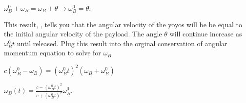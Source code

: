 \documentclass[letterpaper,10pt,english]{sphinxmanual}
\begin{document}
\(\omega_B^0 +\omega_B = \omega_B +\dot{\theta} \rightarrow \omega_B^0 =
\dot{\theta}\).

\begin{sphinxVerbatim}[commandchars=\\\{\}]
  
   
\end{sphinxVerbatim}

This result, , tells you that the angular velocity of the yoyos will be
be equal to the initial angular velocity of the payload. The angle
\(\theta\) will
continue increase as \(\omega_B^0 t\) until released. Plug this result into
the orginal conservation of angular momentum equation to solve for
\(\omega_B\)

\(c(\omega_B^0 - \omega_B) = (\omega_B^0 t)^2(\omega_B+\omega_B^0)\)

\(\omega_B(t) = \frac{c-(\omega_B^0 t)^2}{c+(\omega_B^0 t)^2}\omega_B^0.\)
\end{document}
